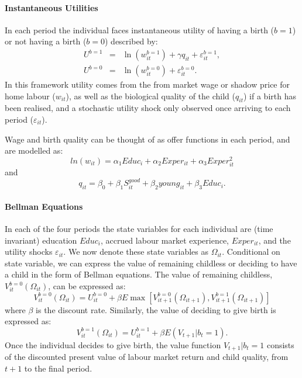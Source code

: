 \documentclass[a4paper, 11 pt]{article}
\theoremstyle{plain}
\begin{document}
\begin{spacing}{1.2}
\paragraph{Instantaneous Utilities}
In each period the individual faces instantaneous utility of having a birth
($b=1$) or not having a birth ($b=0$) described by:
\begin{eqnarray}
U^{b=1}&=&\ln(w_{it}^{b=1}) + \gamma q_{it} + \varepsilon^{b=1}_{it}, \nonumber \\
U^{b=0}&=&\ln(w_{it}^{b=0}) + \varepsilon^{b=0}_{it}. \nonumber 
\end{eqnarray}
In this framework utility comes from the from market wage or shadow price for 
home labour ($w_{it}$), as well as the biological quality of the child ($q_{it}$)
if a birth has been realised, and a stochastic utility shock only observed once 
arriving to each period ($\varepsilon_{it}$).

Wage and birth quality can be thought of as offer functions in each period, and 
are modelled as:
\[
ln(w_{it})=\alpha_1 Educ_{i} + \alpha_2 Exper_{it} + \alpha_3 Exper_{it}^2
\]
and
\[
q_{it} = \beta_0 + \beta_1 S^{good}_{it} + \beta_2 young_{it} + \beta_3 Educ_{i}.
\]

\paragraph{Bellman Equations} In each of the four periods the state variables
for each individual are (time invariant) education $Educ_i$, accrued labour 
market experience, $Exper_{it}$, and the utility shocks $\varepsilon_{it}$.  
We now denote these state variables as $\Omega_{it}$.  Conditional on state 
variable, we can express the value of remaining childless or deciding to have 
a child in the form of Bellman equations.  The value of remaining childless, 
$V_{it}^{b=0}(\Omega_{it})$, can be expressed as:
\begin{equation}
\label{beEqn:VF0}
V_{it}^{b=0}(\Omega_{it})=U_{it}^{b=0}+\beta E\max
                         [V_{it+1}^{b=0}(\Omega_{it+1}),V_{it+1}^{b=1}(\Omega_{it+1})]
\end{equation}
where $\beta$ is the discount rate.  Similarly, the value of deciding to
give birth is expressed as:
\begin{equation}
\label{beEqn:VF1}
V_{it}^{b=1}(\Omega_{it})=U_{it}^{b=1}+\beta E(V_{t+1}|b_t=1).
\end{equation}
Once the individual decides to give birth, the value function $V_{t+1}|b_t=1$
consists of the discounted present value of labour market return and child
quality, from $t+1$ to the final period.


\end{spacing}
\end{document}
